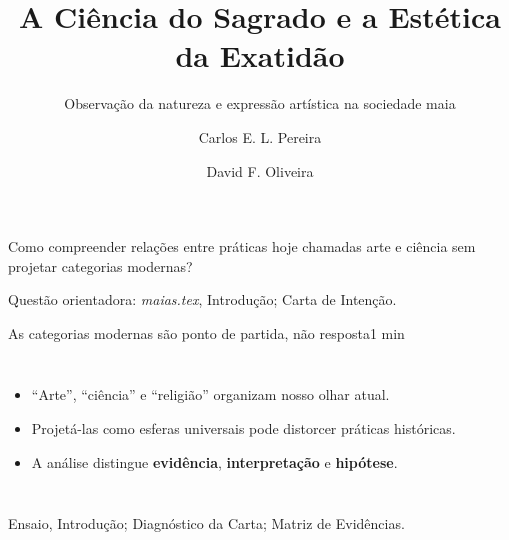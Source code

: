\documentclass[aspectratio=169,11pt]{beamer}
\title{A Ciência do Sagrado e a Estética da Exatidão}
\subtitle{Observação da natureza e expressão artística na sociedade maia}
\author{Carlos E. L. Pereira \and David F. Oliveira}
\institute{IMPA Tech — Rio de Janeiro}
\date{}
\newcommand{\source}[1]{\vfill{\tiny\color{mayaInk!70}#1}}
\newcommand{\minutes}[1]{\hfill{\scriptsize\color{mayaJade}#1}}
\begin{document}
\begin{frame}[plain]
  \titlepage
  \vspace{-0.5cm}
  \begin{center}
    \small Como compreender relações entre práticas hoje chamadas arte e ciência sem projetar categorias modernas?
  \end{center}
  \source{Questão orientadora: \textit{maias.tex}, Introdução; Carta de Intenção.}
\end{frame}

\begin{frame}{As categorias modernas são ponto de partida, não resposta}\minutes{1 min}
  \begin{columns}[T,onlytextwidth]
      \begin{itemize}
        \item “Arte”, “ciência” e “religião” organizam nosso olhar atual.
        \item Projetá-las como esferas universais pode distorcer práticas históricas.
        \item A análise distingue \textbf{evidência}, \textbf{interpretação} e \textbf{hipótese}.
      \end{itemize}
      \centering
  \end{columns}
  \source{Ensaio, Introdução; Diagnóstico da Carta; Matriz de Evidências.}
\end{frame}
\end{document}

